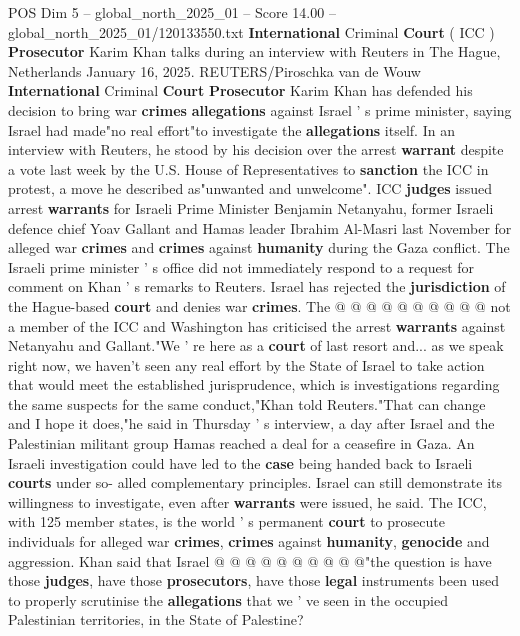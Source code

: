 \begin{textsample}{POS Dim 5 – global\_north\_2025\_01 – Score 14.00 – global\_north\_2025\_01/120133550.txt}  \label{ex:f5_pos_385}
\textbf{International} Criminal \textbf{Court} ( ICC ) \textbf{Prosecutor} Karim Khan talks during an interview with Reuters in The Hague, Netherlands January 16, 2025.
REUTERS/Piroschka van de Wouw \textbf{International} Criminal \textbf{Court} \textbf{Prosecutor} Karim Khan has defended his decision to bring war \textbf{crimes} \textbf{allegations} against Israel ' s prime minister, saying Israel had made"no real effort"to investigate the \textbf{allegations} itself.
In an interview with Reuters, he stood by his decision over the arrest \textbf{warrant} despite a vote last week by the U.S.
House of Representatives to \textbf{sanction} the ICC in protest, a move he described as"unwanted and unwelcome".
ICC \textbf{judges} issued arrest \textbf{warrants} for Israeli Prime Minister Benjamin Netanyahu, former Israeli defence chief Yoav Gallant and Hamas leader Ibrahim Al-Masri last November for alleged war \textbf{crimes} and \textbf{crimes} against \textbf{humanity} during the Gaza conflict.
The Israeli prime minister ' s office did not immediately respond to a request for comment on Khan ' s remarks to Reuters.
Israel has rejected the \textbf{jurisdiction} of the Hague-based \textbf{court} and denies war \textbf{crimes}.
The @ @ @ @ @ @ @ @ @ @ not a member of the ICC and Washington has criticised the arrest \textbf{warrants} against Netanyahu and Gallant."We ' re here as a \textbf{court} of last resort and... as we speak right now, we haven't seen any real effort by the State of Israel to take action that would meet the established jurisprudence, which is investigations regarding the same suspects for the same conduct,"Khan told Reuters."That can change and I hope it does,"he said in Thursday ' s interview, a day after Israel and the Palestinian militant group Hamas reached a deal for a ceasefire in Gaza.
An Israeli investigation could have led to the \textbf{case} being handed back to Israeli \textbf{courts} under so- alled complementary principles.
Israel can still demonstrate its willingness to investigate, even after \textbf{warrants} were issued, he said.
The ICC, with 125 member states, is the world ' s permanent \textbf{court} to prosecute individuals for alleged war \textbf{crimes}, \textbf{crimes} against \textbf{humanity}, \textbf{genocide} and aggression.
Khan said that Israel @ @ @ @ @ @ @ @ @ @"the question is have those \textbf{judges}, have those \textbf{prosecutors}, have those \textbf{legal} instruments been used to properly scrutinise the \textbf{allegations} that we ' ve seen in the occupied Palestinian territories, in the State of Palestine?

\end{textsample}
